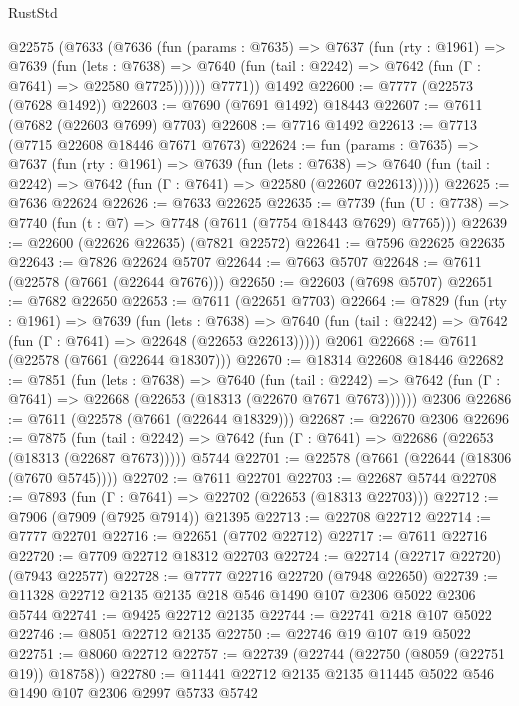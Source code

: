 \begin{lexlean}{RustStd}
\begin{coremodule}
    @22575
      (@7633
        (@7636
          (fun (params : @7635) =>
          @7637
            (fun (rty : @1961) =>
            @7639
              (fun (lets : @7638) =>
              @7640 (fun (tail : @2242) => @7642 (fun (Γ : @7641) => @22580 @7725))))))
        @7771))
    @1492
@22600 := @7777 (@22573 (@7628 @1492))
@22603 := @7690 (@7691 @1492) @18443
@22607 := @7611 (@7682 (@22603 @7699) @7703)
@22608 := @7716 @1492
@22613 := @7713 (@7715 @22608 @18446 @7671 @7673)
@22624 := fun (params : @7635) =>
  @7637
    (fun (rty : @1961) =>
    @7639
      (fun (lets : @7638) =>
      @7640 (fun (tail : @2242) => @7642 (fun (Γ : @7641) => @22580 (@22607 @22613)))))
@22625 := @7636 @22624
@22626 := @7633 @22625
@22635 := @7739
    (fun (U : @7738) => @7740 (fun (t : @7) => @7748 (@7611 (@7754 @18443 @7629) @7765)))
@22639 := @22600 (@22626 @22635) (@7821 @22572)
@22641 := @7596 @22625 @22635
@22643 := @7826 @22624 @5707
@22644 := @7663 @5707
@22648 := @7611 (@22578 (@7661 (@22644 @7676)))
@22650 := @22603 (@7698 @5707)
@22651 := @7682 @22650
@22653 := @7611 (@22651 @7703)
@22664 := @7829
    (fun (rty : @1961) =>
    @7639
      (fun (lets : @7638) =>
      @7640 (fun (tail : @2242) => @7642 (fun (Γ : @7641) => @22648 (@22653 @22613)))))
    @2061
@22668 := @7611 (@22578 (@7661 (@22644 @18307)))
@22670 := @18314 @22608 @18446
@22682 := @7851
    (fun (lets : @7638) =>
    @7640
      (fun (tail : @2242) =>
      @7642 (fun (Γ : @7641) => @22668 (@22653 (@18313 (@22670 @7671 @7673))))))
    @2306
@22686 := @7611 (@22578 (@7661 (@22644 @18329)))
@22687 := @22670 @2306
@22696 := @7875
    (fun (tail : @2242) => @7642 (fun (Γ : @7641) => @22686 (@22653 (@18313 (@22687 @7673)))))
    @5744
@22701 := @22578 (@7661 (@22644 (@18306 (@7670 @5745))))
@22702 := @7611 @22701
@22703 := @22687 @5744
@22708 := @7893 (fun (Γ : @7641) => @22702 (@22653 (@18313 @22703)))
@22712 := @7906 (@7909 (@7925 @7914)) @21395
@22713 := @22708 @22712
@22714 := @7777 @22701
@22716 := @22651 (@7702 @22712)
@22717 := @7611 @22716
@22720 := @7709 @22712 @18312 @22703
@22724 := @22714 (@22717 @22720) (@7943 @22577)
@22728 := @7777 @22716 @22720 (@7948 @22650)
@22739 := @11328 @22712 @2135 @2135 @218 @546 @1490 @107 @2306 @5022 @2306 @5744
@22741 := @9425 @22712 @2135
@22744 := @22741 @218 @107 @5022
@22746 := @8051 @22712 @2135
@22750 := @22746 @19 @107 @19 @5022
@22751 := @8060 @22712
@22757 := @22739 (@22744 (@22750 (@8059 (@22751 @19)) @18758))
@22780 := @11441
    @22712
    @2135
    @2135
    @11445
    @5022
    @546
    @1490
    @107
    @2306
    @2997
    @5733
    @5742

\end{coremodule}
\end{lexlean}
